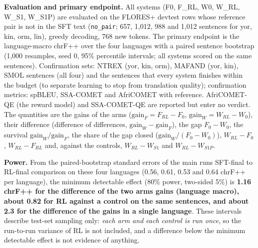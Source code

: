 \textbf{Evaluation and primary endpoint.} All systems (F0, F\_RL, W0, W\_RL, W\_S1, W\_S1P) are evaluated on the FLORES+ devtest rows whose reference pair is not in the SFT text (\texttt{no\_pair}; 657, 1,012, 988 and 1,012 sentences for yor, kin, orm, lin), greedy decoding, 768 new tokens. The primary endpoint is the language-macro chrF++ over the four languages with a paired sentence bootstrap (1,000 resamples, seed 0, 95\% percentile intervals; all systems scored on the same sentences). Confirmation sets: NTREX (yor, kin, orm), MAFAND (yor, kin), SMOL sentences (all four) and the sentences that every system finishes within the budget (to separate learning to stop from translation quality); confirmation metrics: spBLEU, SSA-COMET and AfriCOMET with reference. AfriCOMET-QE (the reward model) and SSA-COMET-QE are reported but enter no verdict. The quantities are the gains of the arms (\(\text{gain}_F=F_{RL}-F_0\), \(\text{gain}_W=W_{RL}-W_0\)), their difference (difference of differences, \(\text{gain}_W-\text{gain}_F\)), the gap \(F_0-W_0\), the survival \(\text{gain}_W/\text{gain}_F\), the share of the gap closed (\(\text{gain}_W/(F_0-W_0)\)), \(W_{RL}-F_0\), \(W_{RL}-F_{RL}\) and, against the controls, \(W_{RL}-W_{S1}\) and \(W_{RL}-W_{S1P}\).

\textbf{Power.} From the paired-bootstrap standard errors of the main run\textquotesingle s SFT-final to RL-final comparison on these four languages (0.56, 0.61, 0.53 and 0.64 chrF++ per language), the minimum detectable effect (80\% power, two-sided 5\%) is \textbf{1.16 chrF++ for the difference of the two arms\textquotesingle{} gains (language macro), about 0.82 for RL against a control on the same sentences, and about 2.3 for the difference of the gains in a single language}. These intervals describe test-set sampling only: \emph{each arm and each control is run once}, so the run-to-run variance of RL is not included, and a difference below the minimum detectable effect is not evidence of anything.

